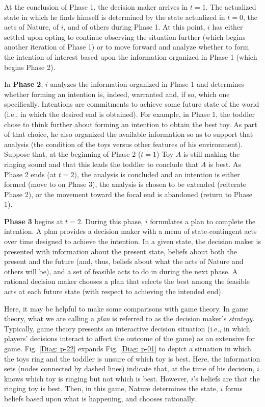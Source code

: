 \documentclass[
11pt,
titlepage,
reqno,
]{article}%
\theoremstyle{definition}
\begin{document}
At the conclusion of Phase 1, the decision maker arrives in $t=1$. The actualized state in which he finds himself is determined by the state actualized in $t=0$, the acts of Nature, of $i$, and of others during Phase 1. At this point, $i$ has either settled upon opting to continue observing the situation further (which begins another iteration of Phase 1) or to move forward and analyze whether to form the intention of interest based upon the information organized in Phase 1 (which begins Phase 2). 

In \textbf{Phase 2}, $i$ analyzes the information organized in Phase 1 and determines whether forming an intention is, indeed, warranted and, if so, which one specifically. Intentions are commitments to achieve some future state of the world (i.e., in which the desired end is obtained). For example, in Phase 1, the toddler chose to think further about forming an intention to obtain the best toy. As part of that choice, he also organized the available information so as to support that analysis (the condition of the toys versus other features of his environment). Suppose that, at the beginning of Phase 2 ($t=1$) Toy $A$ is still making the ringing sound and that this leads the toddler to conclude that $A$ is best. As Phase 2 ends (at $t=2)$, the analysis is concluded and an intention is either formed (move to on Phase 3), the analysis is chosen to be extended (reiterate Phase 2), or the movement toward the focal end is abandoned (return to Phase 1). 

\textbf{Phase 3} begins at $t=2$. During this phase, $i$ formulates a plan to complete the intention. A plan provides a decision maker with  a menu of state-contingent acts over time designed to achieve the intention. In a given state, the decision maker is presented with information about the present state, beliefs about both the present and the future (and, thus, beliefs about what the acts of Nature and others will be), and a set of feasible acts to do in during the next phase. A rational decision maker chooses a plan that selects the best among the feasible acts at each future state (with respect to achieving the intended end).

Here, it may be helpful to make some comparisons with game theory. In game theory, what we are calling a \textit{plan} is referred to as the decision maker's \textit{strategy}. Typically, game theory presents an interactive decision situation (i.e., in which players' decisions interact to affect the outcome of the game) as an extensive for game. Fig. \ref{Diag: p-22} expands Fig. \ref{Diag: p-01} to depict a situation in which the toys ring and the toddler is unsure of which toy is best. Here, the information sets (nodes connected by dashed lines) indicate that, at the time of his decision, $i$ knows which toy is ringing but not which is best. However, $i$'s beliefs are that the ringing toy is best. Then, in this game, Nature determines the state, $i$ forms beliefs based upon what is happening, and chooses rationally. 
\end{document}
